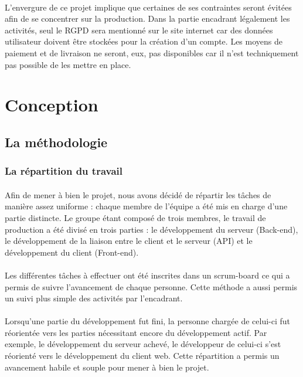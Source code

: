 \documentclass[a4paper, 12pt]{article}
\begin{document}
\paragraph{}L’envergure de ce projet implique que certaines de ses contraintes seront évitées afin de se concentrer sur la production. Dans la partie encadrant légalement les activités, seul le RGPD sera mentionné sur le site internet car des données utilisateur doivent être stockées pour la création d’un compte. Les moyens de paiement et de livraison ne seront, eux, pas disponibles car il n’est techniquement pas possible de les mettre en place.

\newpage
\section{Conception}
\subsection{La méthodologie}
\subsubsection{La répartition du travail}
\paragraph{}Afin de mener à bien le projet, nous avons décidé de répartir les tâches de manière assez uniforme : chaque membre de l’équipe a été mis en charge d’une partie distincte. Le groupe étant composé de trois membres, le travail de production a été divisé en trois parties : le développement du serveur (Back-end), le développement de la liaison entre le client et le serveur (API) et le développement du client (Front-end).
\paragraph{}Les différentes tâches à effectuer ont été inscrites dans un scrum-board ce qui a permis de suivre l’avancement de chaque personne. Cette méthode a aussi permis un suivi plus simple des activités par l’encadrant.
\paragraph{}Lorsqu’une partie du développement fut fini, la personne chargée de celui-ci fut réorientée vers les parties nécessitant encore du développement actif. Par exemple, le développement du serveur achevé, le développeur de celui-ci s’est réorienté vers le développement du client web.
Cette répartition a permis un avancement habile et souple pour mener à bien le projet.
\end{document}
